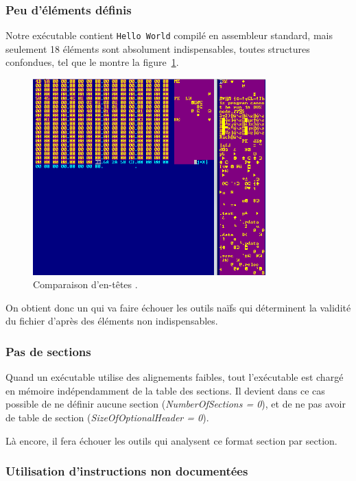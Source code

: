 \subsubsection*{Peu d'éléments définis}

Notre exécutable contient \texttt{Hello World} compilé en assembleur standard, mais seulement 18 éléments sont absolument indispensables, toutes structures confondues, tel que le montre la figure~\ref{fig:albertini:empty_pe_header}.

\begin{figure}[ht]
  \centering
  \includegraphics[width=0.8\textwidth]{albertini/img/empty_pe_header}
  \caption{Comparaison d'en-têtes \PE.}
  \label{fig:albertini:empty_pe_header}
\end{figure}

On obtient donc un \PE qui va faire échouer les outils naïfs qui déterminent la validité du fichier d'après des éléments non indispensables.

\subsubsection*{Pas de sections}

Quand un exécutable utilise des alignements faibles, tout l'exécutable est chargé en mémoire indépendamment de la table des sections. Il devient dans ce cas possible de ne définir aucune section (\emph{NumberOfSections = 0}), et de ne pas avoir de table de section (\emph{SizeOfOptionalHeader = 0}).

Là encore, il fera échouer les outils qui analysent ce format section par section.

\subsubsection*{Utilisation d'instructions non documentées}

